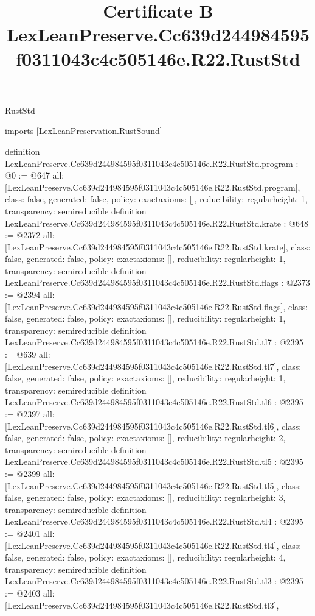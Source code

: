 \begin{lexlean}{RustStd}
\title{Certificate B LexLeanPreserve.Cc639d244984595f0311043c4c505146e.R22.RustStd}
\begin{coremodule}
imports [LexLeanPreservation.RustSound]

definition LexLeanPreserve.Cc639d244984595f0311043c4c505146e.R22.RustStd.program : @0 := @647 {
  all: [LexLeanPreserve.Cc639d244984595f0311043c4c505146e.R22.RustStd.program],
  class: false,
  generated: false,
  policy: exact{axioms: []},
  reducibility: regular{height: 1},
  transparency: semireducible
}
definition LexLeanPreserve.Cc639d244984595f0311043c4c505146e.R22.RustStd.krate : @648 := @2372 {
  all: [LexLeanPreserve.Cc639d244984595f0311043c4c505146e.R22.RustStd.krate],
  class: false,
  generated: false,
  policy: exact{axioms: []},
  reducibility: regular{height: 1},
  transparency: semireducible
}
definition LexLeanPreserve.Cc639d244984595f0311043c4c505146e.R22.RustStd.flags : @2373 := @2394 {
  all: [LexLeanPreserve.Cc639d244984595f0311043c4c505146e.R22.RustStd.flags],
  class: false,
  generated: false,
  policy: exact{axioms: []},
  reducibility: regular{height: 1},
  transparency: semireducible
}
definition LexLeanPreserve.Cc639d244984595f0311043c4c505146e.R22.RustStd.tl7 : @2395 := @639 {
  all: [LexLeanPreserve.Cc639d244984595f0311043c4c505146e.R22.RustStd.tl7],
  class: false,
  generated: false,
  policy: exact{axioms: []},
  reducibility: regular{height: 1},
  transparency: semireducible
}
definition LexLeanPreserve.Cc639d244984595f0311043c4c505146e.R22.RustStd.tl6 : @2395 := @2397 {
  all: [LexLeanPreserve.Cc639d244984595f0311043c4c505146e.R22.RustStd.tl6],
  class: false,
  generated: false,
  policy: exact{axioms: []},
  reducibility: regular{height: 2},
  transparency: semireducible
}
definition LexLeanPreserve.Cc639d244984595f0311043c4c505146e.R22.RustStd.tl5 : @2395 := @2399 {
  all: [LexLeanPreserve.Cc639d244984595f0311043c4c505146e.R22.RustStd.tl5],
  class: false,
  generated: false,
  policy: exact{axioms: []},
  reducibility: regular{height: 3},
  transparency: semireducible
}
definition LexLeanPreserve.Cc639d244984595f0311043c4c505146e.R22.RustStd.tl4 : @2395 := @2401 {
  all: [LexLeanPreserve.Cc639d244984595f0311043c4c505146e.R22.RustStd.tl4],
  class: false,
  generated: false,
  policy: exact{axioms: []},
  reducibility: regular{height: 4},
  transparency: semireducible
}
definition LexLeanPreserve.Cc639d244984595f0311043c4c505146e.R22.RustStd.tl3 : @2395 := @2403 {
  all: [LexLeanPreserve.Cc639d244984595f0311043c4c505146e.R22.RustStd.tl3],
}
\end{coremodule}
\end{lexlean}
